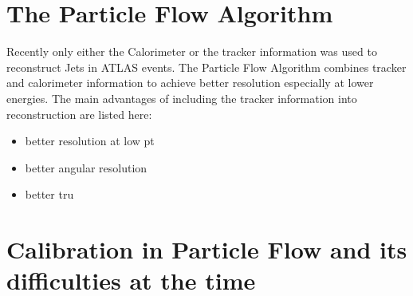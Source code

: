 \section{The Particle Flow Algorithm}

Recently only either the Calorimeter or the tracker information was used to reconstruct Jets in ATLAS events. The Particle Flow Algorithm combines tracker and calorimeter information to achieve better resolution especially at lower energies. The main advantages of including the tracker information into reconstruction are listed here:

\begin{itemize}
\item better resolution at low pt
\item better angular resolution
\item better tru
\end{itemize}


\section{Calibration in Particle Flow and its difficulties at the time}